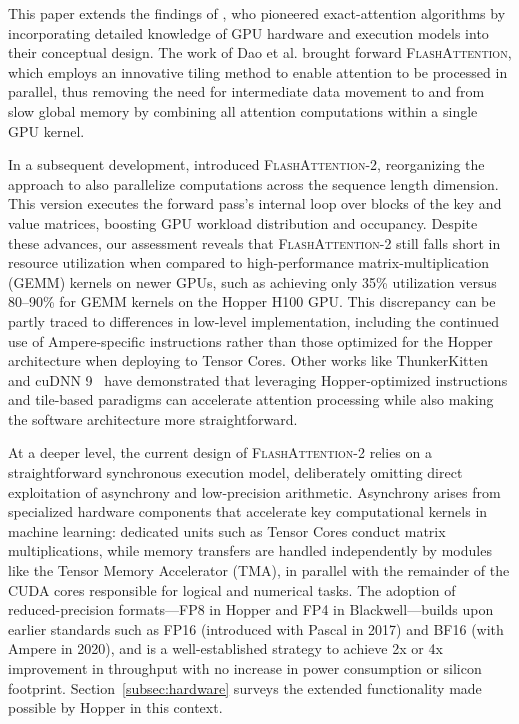 This paper extends the findings of \citet{dao2022flashattention}, who pioneered exact-attention algorithms by incorporating detailed knowledge of GPU hardware and execution models into their conceptual design. The work of Dao et al. \citep{dao2022flashattention} brought forward \textsc{FlashAttention}, which employs an innovative tiling method to enable attention to be processed in parallel, thus removing the need for intermediate data movement to and from slow global memory by combining all attention computations within a single GPU kernel.

In a subsequent development, \citet{dao2023flashattention2} introduced \textsc{FlashAttention-2}, reorganizing the approach to also parallelize computations across the sequence length dimension. This version executes the forward pass's internal loop over blocks of the key and value matrices, boosting GPU workload distribution and occupancy. Despite these advances, our assessment reveals that \textsc{FlashAttention-2} still falls short in resource utilization when compared to high-performance matrix-multiplication (GEMM) kernels on newer GPUs, such as achieving only 35\% utilization versus 80–90\% for GEMM kernels on the Hopper H100 GPU. This discrepancy can be partly traced to differences in low-level implementation, including the continued use of Ampere-specific instructions rather than those optimized for the Hopper architecture when deploying to Tensor Cores. Other works like ThunkerKitten~\citep{spector2024thunder} and cuDNN 9~\citep{cudnn9} have demonstrated that leveraging Hopper-optimized instructions and tile-based paradigms can accelerate attention processing while also making the software architecture more straightforward.

At a deeper level, the current design of \textsc{FlashAttention-2} relies on a straightforward synchronous execution model, deliberately omitting direct exploitation of asynchrony and low-precision arithmetic. Asynchrony arises from specialized hardware components that accelerate key computational kernels in machine learning: dedicated units such as Tensor Cores conduct matrix multiplications, while memory transfers are handled independently by modules like the Tensor Memory Accelerator (TMA), in parallel with the remainder of the CUDA cores responsible for logical and numerical tasks. The adoption of reduced-precision formats—FP8 in Hopper and FP4 in Blackwell—builds upon earlier standards such as FP16 (introduced with Pascal in 2017) and BF16 (with Ampere in 2020), and is a well-established strategy to achieve 2x or 4x improvement in throughput with no increase in power consumption or silicon footprint. Section~\cref{subsec:hardware} surveys the extended functionality made possible by Hopper in this context. 

